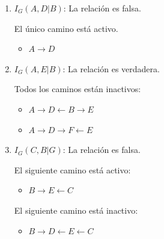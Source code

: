 \documentclass[12pt,a4paper]{article}
\begin{document}
\begin{enumerate}
\begin{enumerate}
        \begin{multicols}{2}
            El siguiente camino está activo:
            \begin{itemize}
                \item $A \to D \to F \leftarrow E \leftarrow B$
            \end{itemize}

            El siguiente camino está inactivo:
            \begin{itemize}
                \item $A \to D \leftarrow B$
            \end{itemize}
        \end{multicols}
        
        \item $I_G(A, D | B)$: \; La relación es falsa.
        
        El único camino está activo.
        \begin{multicols}{2}
            \begin{itemize}
                \item $A \to D$
            \end{itemize}
        \end{multicols}

        \item $I_G(A, E | B)$: \; La relación es verdadera.
        
        Todos los caminos están inactivos:
        \begin{multicols}{2}
            \begin{itemize}
                \item $A \to D \leftarrow B \to E$
                \item $A \to D \to F \leftarrow E$
            \end{itemize}
        \end{multicols}

        \item $I_G(C, B | G)$: \; La relación es falsa.
        
        \begin{multicols}{2}
            El siguiente camino está activo:
            \begin{itemize}
                \item $B \to E \leftarrow C$
            \end{itemize}

            El siguiente camino está inactivo:
            \begin{itemize}
                \item $B \to D \leftarrow E \leftarrow C$
            \end{itemize}
        \end{multicols}        


\end{enumerate}
\end{enumerate}
\end{document}
